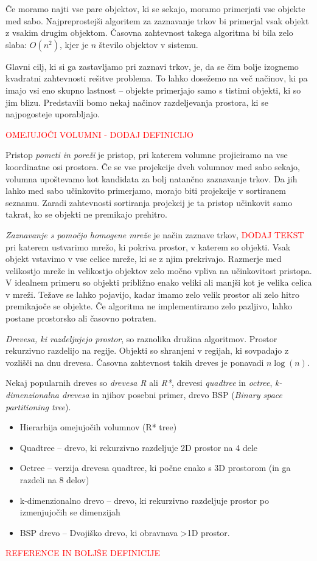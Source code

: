 \documentclass[a4paper,12pt]{article}
\begin{document}
Če moramo najti vse pare objektov, ki se sekajo, moramo primerjati vse objekte med sabo.
Najpreprostejši algoritem za zaznavanje trkov bi primerjal vsak objekt z vsakim drugim objektom. Časovna
zahtevnost takega algoritma bi bila zelo slaba: $O(n^2)$, kjer je $n$ število objektov v sistemu.

Glavni cilj, ki si ga zastavljamo pri zaznavi trkov, je, da se čim bolje izognemo kvadratni zahtevnosti
rešitve problema. To lahko dosežemo na več načinov, ki pa imajo vsi eno skupno lastnost -- objekte 
primerjajo samo s tistimi objekti, ki so jim blizu. Predstavili bomo nekaj načinov razdeljevanja prostora,
ki se najpogosteje uporabljajo.

\textcolor{red}{OMEJUJOČI VOLUMNI - DODAJ DEFINICIJO}

Pristop \textit{pometi in poreži} je pristop, pri katerem volumne projiciramo na vse koordinatne osi prostora. Če se vse projekcije
dveh volumnov med sabo sekajo, volumna upoštevamo kot kandidata za bolj natančno zaznavanje trkov. Da jih lahko med sabo učinkovito
primerjamo, morajo biti projekcije v sortiranem seznamu. Zaradi zahtevnosti sortiranja projekcij je ta pristop
učinkovit samo takrat, ko se objekti ne premikajo prehitro.



\textit{Zaznavanje s pomočjo homogene mreže} je način zaznave trkov, \textcolor{red}{DODAJ TEKST} pri katerem ustvarimo mrežo, ki pokriva prostor, v katerem
so objekti. Vsak objekt vstavimo v vse celice mreže, ki se z njim prekrivajo. Razmerje med velikostjo mreže in velikostjo
objektov zelo močno vpliva na učinkovitost pristopa. V idealnem primeru so objekti približno enako veliki ali manjši kot
je velika celica v mreži. Težave se lahko pojavijo, kadar imamo zelo velik prostor ali zelo
hitro premikajoče se objekte.  Če algoritma ne implementiramo zelo pazljivo, lahko postane prostorsko ali časovno potraten.

\textit{Drevesa, ki razdeljujejo prostor}, so raznolika družina algoritmov. Prostor rekurzivno razdelijo na regije.
Objekti so shranjeni v regijah, ki sovpadajo z vozlišči na dnu drevesa. Časovna zahtevnost takih
dreves je ponavadi $n \log(n)$. 

Nekaj popularnih dreves\cite{weller_brief_2013} so \textit{drevesa R} ali \textit{ R*}, drevesi \textit{quadtree} in \textit{octree}, \textit{k-di\-men\-zi\-o\-nal\-na
drevesa} in njihov posebni primer, drevo BSP (\textit{Binary space partitioning tree}).

\begin{itemize}
    \item Hierarhija omejujočih volumnov (R* tree)
    \item Quadtree -- drevo, ki rekurzivno razdeljuje 2D prostor na 4 dele
    \item Octree -- verzija drevesa quadtree, ki počne enako s 3D prostorom (in ga razdeli na 8 delov)
    \item k-dimenzionalno drevo -- drevo, ki rekurzivno razdeljuje prostor po izmenjujočih se dimenzijah
    \item BSP drevo -- Dvojiško drevo, ki obravnava >1D prostor.
\end{itemize}
\textcolor{red}{REFERENCE IN BOLJŠE DEFINICIJE}
\end{document}
